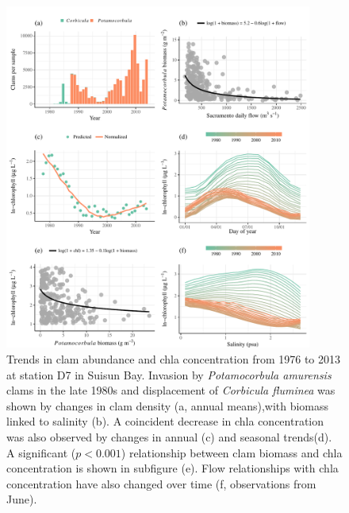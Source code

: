 \documentclass[journal = esthag, manuscript = article]{achemso}\usepackage[]{graphicx}\usepackage[]{color}
\begin{document}
\begin{figure}[!ht]

{\centering \includegraphics[width=0.9\textwidth]{figs/clmchl-1} 

}

\caption{Trends in clam abundance and \ac{chla} concentration from 1976 to 2013 at station D7 in Suisun Bay.  Invasion by \textit{Potamocorbula amurensis} clams in the late 1980s and displacement of \textit{Corbicula fluminea} was shown by changes in clam density (a, annual means),with biomass linked to salinity (b).  A coincident decrease in \ac{chla} concentration was also observed by changes in annual (c) and seasonal trends(d).  A significant ($p < 0.001$) relationship between clam biomass and \ac{chla} concentration is shown in subfigure (e).  Flow relationships with \ac{chla} concentration have also changed over time (f, observations from June).}\label{fig:clmchl}
\end{figure}



\clearpage
\end{document}
